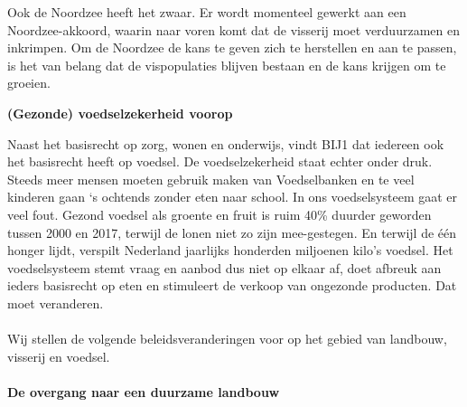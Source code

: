 Ook de Noordzee heeft het zwaar. Er wordt momenteel gewerkt aan een
Noordzee-akkoord, waarin naar voren komt dat de visserij moet
verduurzamen en inkrimpen. Om de Noordzee de kans te geven zich te
herstellen en aan te passen, is het van belang dat de vispopulaties
blijven bestaan en de kans krijgen om te groeien.

\textbf{(Gezonde) voedselzekerheid voorop}

Naast het basisrecht op zorg, wonen en onderwijs, vindt BIJ1 dat
iedereen ook het basisrecht heeft op voedsel. De voedselzekerheid staat
echter onder druk. Steeds meer mensen moeten gebruik maken van
Voedselbanken en te veel kinderen gaan `s ochtends zonder eten naar
school. In ons voedselsysteem gaat er veel fout. Gezond voedsel als
groente en fruit is ruim 40\% duurder geworden tussen 2000 en 2017,
terwijl de lonen niet zo zijn mee-gestegen. En terwijl de één honger
lijdt, verspilt Nederland jaarlijks honderden miljoenen kilo's voedsel.
Het voedselsysteem stemt vraag en aanbod dus niet op elkaar af, doet
afbreuk aan ieders basisrecht op eten en stimuleert de verkoop van
ongezonde producten. Dat moet veranderen.\\
~\\
Wij stellen de volgende beleidsveranderingen voor op het gebied van
landbouw, visserij en voedsel.\\
~\\
\textbf{De overgang naar een duurzame landbouw}

